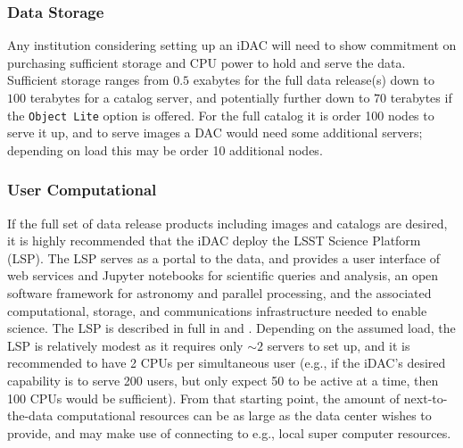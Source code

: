 \subsubsection{Data Storage}
Any institution considering setting up an iDAC will need to show commitment on purchasing sufficient storage and CPU power to hold and serve the data. Sufficient storage ranges from $0.5$ exabytes for the full data release(s) down to $100$ terabytes for a catalog server, and potentially further down to $70$ terabytes if the {\tt Object Lite} option is offered. For the full catalog it is order 100 nodes to serve it up, and to serve images a DAC would need some additional servers; depending on load this may be order 10 additional nodes.

\subsubsection{User Computational}
If the full set of data release products including images and catalogs are desired, it is highly recommended that the iDAC deploy the LSST Science Platform (LSP). The LSP serves as a portal to the data, and provides a user interface of web services and Jupyter notebooks for scientific queries and analysis, an open software framework for astronomy and parallel processing, and the associated computational, storage, and communications infrastructure needed to enable science. The LSP is described in full in  and . Depending on the assumed load, the LSP is relatively modest as it requires only $\sim2$ servers to set up, and it is recommended to have 2 CPUs per simultaneous user (e.g., if the iDAC's desired capability is to serve 200 users, but only expect 50 to be active at a time, then 100 CPUs would be sufficient). From that starting point, the amount of next-to-the-data computational resources can be as large as the data center wishes to provide, and may make use of connecting to e.g., local super computer resources.

